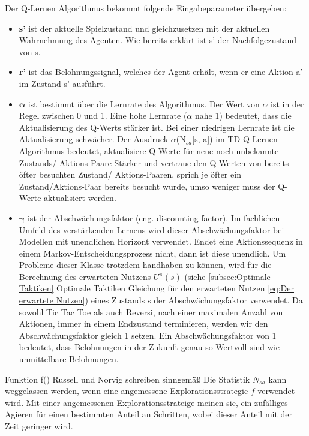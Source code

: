Der Q-Lernen Algorithmus bekommt folgende Eingabeparameter übergeben:

\begin{itemize}
\item \textbf{s'} ist der aktuelle Spielzustand und gleichzusetzen mit der aktuellen Wahrnehmung des Agenten. Wie bereits erklärt ist s' der Nachfolgezustand von s.

\item \textbf{r'} ist das Belohnungssignal, welches der Agent erhält, wenn er eine Aktion a' im Zustand s' ausführt. 

\item $\boldsymbol{\alpha}$ ist bestimmt über die Lernrate des Algorithmus. Der Wert von $\alpha$ ist in der Regel zwischen 0 und 1. Eine hohe Lernrate ($\alpha$ nahe 1) bedeutet, dass die Aktualisierung des Q-Werts stärker ist. Bei einer niedrigen Lernrate ist die Aktualisierung schwächer. Der Ausdruck $\alpha$(N$_{sa}$[s, a]) im TD-Q-Lernen Algorithmus bedeutet, aktualisiere Q-Werte für neue noch unbekannte Zustands/ Aktions-Paare Stärker und vertraue den Q-Werten von bereits öfter besuchten Zustand/ Aktions-Paaren, sprich je öfter ein Zustand/Aktions-Paar bereits besucht wurde, umso weniger muss der Q-Werte aktualisiert werden.

\item $\boldsymbol{\gamma}$ ist der Abschwächungsfaktor (eng. discounting factor). Im fachlichen Umfeld des verstärkenden Lernens wird dieser Abschwächungsfaktor bei Modellen mit unendlichen Horizont verwendet. Endet eine Aktionssequenz in einem Markov-Entscheidungsprozess nicht, dann ist diese unendlich. Um Probleme dieser Klasse trotzdem handhaben zu können, wird für die Berechnung des erwarteten Nutzens $U^\pi(s)$ (siehe \ref{subsec:Optimale Taktiken} Optimale Taktiken Gleichung für den erwarteten Nutzen \ref{eq:Der erwartete Nutzen}) eines Zustands s der Abschwächungsfaktor verwendet. Da sowohl Tic Tac Toe als auch Reversi, nach einer maximalen Anzahl von Aktionen, immer in einem Endzustand terminieren, werden wir den Abschwächungsfaktor gleich 1 setzen. Ein Abschwächungsfaktor von 1 bedeutet, dass Belohnungen in der Zukunft genau so Wertvoll sind wie unmittelbare Belohnungen. 
\end{itemize} 



Funktion f()
Russell und Norvig schreiben sinngemäß \cite[974]{Russell} Die Statistik $N_{sa}$ kann weggelassen werden, wenn eine angemessene Explorationsstrategie $f$ verwendet wird. Mit einer angemessenen Explorationsstrateige meinen sie, ein zufälliges Agieren für einen bestimmten Anteil an Schritten, wobei dieser Anteil mit der Zeit geringer wird.

